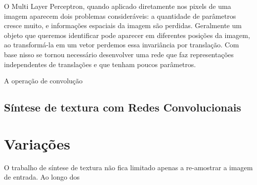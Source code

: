 

O Multi Layer Perceptron,
quando aplicado diretamente
nos pixels de uma imagem aparecem
dois problemas consideráveis:
a quantidade de parâmetros cresce muito,
e informações espaciais da imagem
são perdidas. Geralmente um objeto
que queremos identificar pode aparecer
em diferentes posições da imagem,
ao transformá-la em um vetor
perdemos essa invariância por translação.
Com base nisso se tornou necessário
desenvolver uma rede que faz representações
independentes de translações e que tenham
poucos parâmetros.


A operação de convolução













\section{Síntese de textura com Redes Convolucionais}






\chapter{Variações}

O trabalho de síntese de textura
não fica limitado apenas a re-amostrar
a imagem de entrada. Ao longo
dos 

